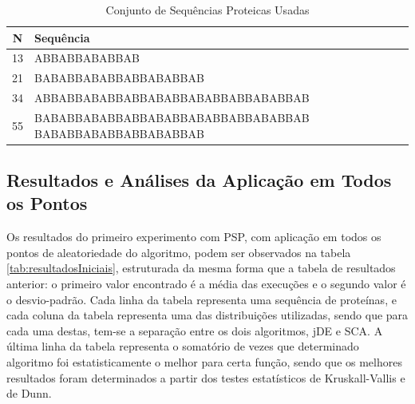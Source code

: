 \begin{table}[!htpb]
    \centering
    \begin{tabularx}{\textwidth}{c|X} %
    
      \textbf{N} & \textbf{Sequência}\\
      \hline
      13 & ABBABBABABBAB\\
      \hline
      21 & BABABBABABBABBABABBAB\\
      \hline
      34 & ABBABBABABBABBABABBABABBABBABABBAB\\
      \hline
      55 & BABABBABABBABBABABBABABBABBABABBAB \newline BABABBABABBABBABABBAB\\
    \end{tabularx}
    \caption{Conjunto de Sequências Proteicas Usadas}
    \label{tab:sequencias}
\end{table}

\subsection{Resultados e Análises da Aplicação em Todos os Pontos}

Os resultados do primeiro experimento com PSP, com aplicação em todos os pontos de aleatoriedade do algoritmo, podem ser observados na tabela \ref{tab:resultadosIniciais}, estruturada da mesma forma que a tabela de resultados anterior: o primeiro valor encontrado é a média das execuções e o segundo valor é o desvio-padrão. Cada linha da tabela representa uma sequência de proteínas, e cada coluna da tabela representa uma das distribuições utilizadas, sendo que para cada uma destas, tem-se a separação entre os dois algoritmos, jDE e SCA. A última linha da tabela representa o somatório de vezes que determinado algoritmo foi estatisticamente o melhor para certa função, sendo que os melhores resultados foram determinados a partir dos testes estatísticos de Kruskall-Vallis e de Dunn.

